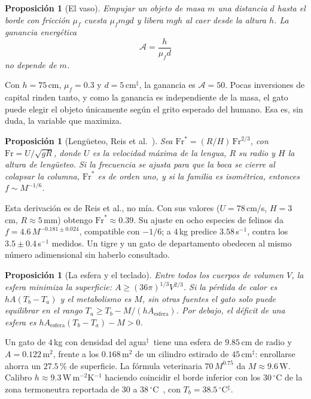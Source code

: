 \documentclass[11pt,a4paper]{article}
\theoremstyle{plain}
\newtheorem{proposicion}[teorema]{Proposición}
\theoremstyle{definition}
\theoremstyle{remark}
\numberwithin{equation}{section}
\newcommand{\calib}{{\ensuremath{^{\ddagger}}}}
\begin{document}
\begin{proposicion}[El vaso]\label{prop:vaso}
Empujar un objeto de masa $m$ una distancia $d$ hasta el borde con fricción $\mu_f$ cuesta $\mu_f mgd$ y libera $mgh$ al caer desde la altura $h$. La ganancia energética
\begin{equation}
  \mathcal A=\frac{h}{\mu_f d}
\end{equation}
no depende de $m$.
\end{proposicion}

Con $h=75$\,cm, $\mu_f=0.3$ y $d=5$\,cm\calib, la ganancia es $\mathcal A=50$. Pocas inversiones de capital rinden tanto, y como la ganancia es independiente de la masa, el gato puede elegir el objeto únicamente según el grito esperado del humano. Esa es, sin duda, la variable que maximiza.

\begin{proposicion}[Lengüeteo, Reis et al.~\cite{reis}]\label{prop:lengua}
Sea $\mathrm{Fr}^{*}=(R/H)\,\mathrm{Fr}^{2/3}$, con $\mathrm{Fr}=U/\sqrt{gR}$, donde $U$ es la velocidad máxima de la lengua, $R$ su radio y $H$ la altura de lengüeteo. Si la frecuencia se ajusta para que la boca se cierre al colapsar la columna, $\mathrm{Fr}^{*}$ es de orden uno, y si la familia es isométrica, entonces $f\sim M^{-1/6}$.
\end{proposicion}

Esta derivación es de Reis et al., no mía. Con sus valores ($U=78$\,cm/s, $H=3$\,cm, $R\approx 5$\,mm) obtengo $\mathrm{Fr}^{*}\approx 0.39$. Su ajuste en ocho especies de felinos da $f=4.6\,M^{-0.181\pm 0.024}$, compatible con $-1/6$; a $4$\,kg predice $3.58$\,s$^{-1}$, contra los $3.5\pm0.4$\,s$^{-1}$ medidos. Un tigre y un gato de departamento obedecen al mismo número adimensional sin haberlo consultado.

\begin{proposicion}[La esfera y el teclado]\label{prop:esfera}
Entre todos los cuerpos de volumen $V$, la esfera minimiza la superficie: $A\ge(36\pi)^{1/3}V^{2/3}$. Si la pérdida de calor es $hA(T_b-T_a)$ y el metabolismo es $M$, sin otras fuentes el gato solo puede equilibrar en el rango $T_a\ge T_b-M/(hA_{\text{esfera}})$. Por debajo, el déficit de una esfera es $hA_{\text{esfera}}(T_b-T_a)-M>0$.
\end{proposicion}

Un gato de $4$\,kg con densidad del agua\calib\ tiene una esfera de $9.85$\,cm de radio y $A=0.122$\,m$^2$, frente a los $0.168$\,m$^2$ de un cilindro estirado de $45$\,cm\calib: enrollarse ahorra un $27.5$\,\% de superficie. La fórmula veterinaria $70\,M^{0.75}$ da $M\approx 9.6$\,W. Calibro $h\approx 9.3$\,W\,m$^{-2}$K$^{-1}$ haciendo coincidir el borde inferior con los $30\,^\circ$C de la zona termoneutra reportada de $30$ a $38\,^\circ$C~\cite{nrc}, con $T_b=38.5\,^\circ$C\calib.
\end{document}

